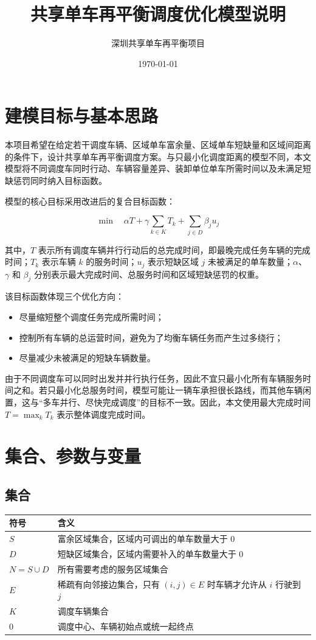 \documentclass[UTF8,a4paper,12pt]{ctexart}
\title{共享单车再平衡调度优化模型说明}
\author{深圳共享单车再平衡项目}
\date{\today}
\begin{document}
\maketitle

\section{建模目标与基本思路}

本项目希望在给定若干调度车辆、区域单车富余量、区域单车短缺量和区域间距离的条件下，设计共享单车再平衡调度方案。与只最小化调度距离的模型不同，本文模型将不同调度车同时行动、车辆容量差异、装卸单位单车所需时间以及未满足短缺惩罚同时纳入目标函数。

模型的核心目标采用改进后的复合目标函数：

\[
\min \quad
\alpha T+\gamma\sum_{k\in K}T_k+\sum_{j\in D}\beta_j u_j
\]

其中，\(T\) 表示所有调度车辆并行行动后的总完成时间，即最晚完成任务车辆的完成时间；\(T_k\) 表示车辆 \(k\) 的服务时间；\(u_j\) 表示短缺区域 \(j\) 未被满足的单车数量；\(\alpha\)、\(\gamma\) 和 \(\beta_j\) 分别表示最大完成时间、总服务时间和区域短缺惩罚的权重。

该目标函数体现三个优化方向：

\begin{itemize}
  \item 尽量缩短整个调度任务完成所需时间；
  \item 控制所有车辆的总运营时间，避免为了均衡车辆任务而产生过多绕行；
  \item 尽量减少未被满足的短缺车辆数量。
\end{itemize}

由于不同调度车可以同时出发并并行执行任务，因此不宜只最小化所有车辆服务时间之和。若只最小化总服务时间，模型可能让一辆车承担很长路线，而其他车辆闲置，这与“多车并行、尽快完成调度”的目标不一致。因此，本文使用最大完成时间 \(T=\max_k T_k\) 表示整体调度完成时间。

\section{集合、参数与变量}

\subsection{集合}

\begin{longtable}{>{\centering\arraybackslash}p{3cm}p{11cm}}
\toprule
符号 & 含义 \\
\midrule
\endhead
\(S\) & 富余区域集合，区域内可调出的单车数量大于 0 \\
\(D\) & 短缺区域集合，区域内需要补入的单车数量大于 0 \\
\(N=S\cup D\) & 所有需要考虑的服务区域集合 \\
\(E\) & 稀疏有向邻接边集合，只有 \((i,j)\in E\) 时车辆才允许从 \(i\) 行驶到 \(j\) \\
\(K\) & 调度车辆集合 \\
\(0\) & 调度中心、车辆初始点或统一起终点 \\
\bottomrule
\end{longtable}
\end{document}
